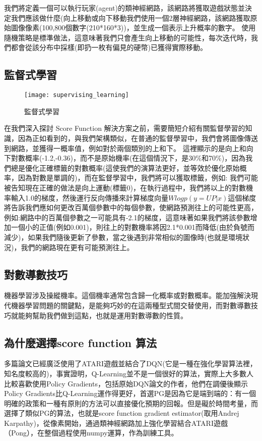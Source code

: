  我們將定義一個可以執行玩家(agent)的類神經網路，該網路將獲取遊戲狀態並決定我們應該做什麼(向上移動或向下移動我們使用一個2層神經網路，該網路獲取原始圖像像素(100,800個數字(210*160*3))，並生成一個表示上升概率的數字。 使用隨機策略是標準做法，這意味著我們只會產生向上移動的可能性，每次迭代時，我們都會從該分布中採樣(即扔一枚有偏見的硬幣)已獲得實際移動。\\

\subsection{監督式學習}
\begin{figure}[hbt!]
\begin{center}
\texttt{[image: supervising\_learning]}
\caption{監督式學習}
\end{center}
\end{figure}

 在我們深入探討 Score Function 解決方案之前，需要簡短介紹有關監督學習的知識，因為正如看到的，與我們架構類似，在普通的監督學習中，我們會將圖像傳送到網路，並獲得一概率值，例如對於兩個類別的上和下。 這裡顯示的是向上和向下對數概率(-1.2,-0.36)，而不是原始機率(在這個情況下，是30$\%$和70$\%$)，因為我們總是優化正確標籤的對數概率(這使我們的演算法更好，並等效於優化原始概率，因為對數是單調的)，而在監督學習中，我們將可以獲取標籤，例如:
我們可能被告知現在正確的做法是向上運動(標籤0)，在執行過程中，我們將以上的對數機率輸入1.0的梯度，然後運行反向傳播來計算梯度向量$Wlogp(y=UP|x)$這個梯度將告訴我們應如何更改百萬個參數中的每個參數，使網路預測往上的可能性更高，例如:網路中的百萬個參數之一可能具有-2.1的梯度，這意味著如果我們將該參數增加一個小的正值(例如0.001)，則往上的對數機率將因2.1*0.001而降低(由於負號而減少)，如果我們隨後更新了參數，當之後遇到非常相似的圖像時(也就是環境狀況)，我們的網路現在更有可能預測往上。\\

\subsection{對數導數技巧}
 機器學習涉及操縱機率。這個機率通常包含歸一化概率或對數概率。能加強解決現代機器學習問題的關鍵點，是能夠巧妙的在這兩種型式間交替使用，而對數導數技巧就能夠幫助我們做到這點，也就是運用對數導數的性質。\\
\subsection{為什麼選擇score function 算法}
 多篇論文已經廣泛使用了ATARI遊戲並結合了DQN(它是一種在強化學習算法裡，知名度較高的)，事實證明，Q-Learning並不是一個很好的算法，實際上大多數人比較喜歡使用Policy Gradients，包括原始DQN論文的作者，他們在調優後顯示Policy Gradients比Q-Learning運作得更好，首選PG是因為它是端到端的：有一個明確的政策和一種有原則的方法可以直接優化預期的回報。但是礙於時間考量，而選擇了類似PG的算法，也就是score function gradient estimator(取用Andrej Karpathy)，從像素開始，通過類神經網路加上強化學習結合ATARI遊戲（Pong），在整個過程使用numpy運算，作為訓練工具。\\ 
